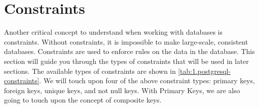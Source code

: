 \section{Constraints}
Another critical concept to understand when working with databases is constraints. Without constraints, it is impossible to make large-scale, consistent databases. Constraints are used to enforce rules on the data in the database. This section will guide you through the types of constraints that will be used in later sections. The available types of constraints are shown in \cref{tab:1.postgresql-constraints}. We will touch upon four of the above constraint types: primary keys, foreign keys, unique keys, and not null keys. With Primary Keys, we are also going to touch upon the concept of composite keys.

\begin{table}[htb]
    \centering
    \caption{Commonly used constraints in PostgreSQL}
    \label{tab:1.postgresql-constraints}
\end{table}

